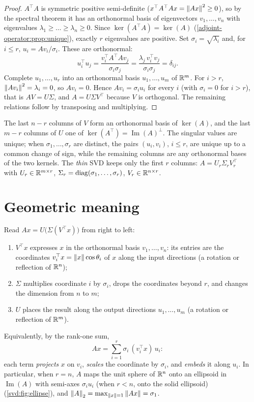 \begin{notechapter}
\begin{proof}
$A^\top A$ is symmetric positive semi-definite ($x^\top A^\top Ax = \left\|Ax\right\|^2\geq0$), so
by the spectral theorem it has an orthonormal basis of eigenvectors $v_1,\dots,v_n$ with
eigenvalues $\lambda_1\geq\dots\geq\lambda_n\geq0$. Since $\ker(A^\top A) = \ker(A)$
(\cref{adjoint-operator:prop:unique}), exactly $r$ eigenvalues are positive. Set
$\sigma_i = \sqrt{\lambda_i}$ and, for $i\leq r$, $u_i = Av_i/\sigma_i$. These are
orthonormal:
\[
  u_i^\top u_j = \frac{v_i^\top A^\top Av_j}{\sigma_i\sigma_j} = \frac{\lambda_j\,v_i^\top v_j}{\sigma_i\sigma_j} = \delta_{ij}.
\]
Complete $u_1,\dots,u_r$ into an orthonormal basis $u_1,\dots,u_m$ of $\mathbb{R}^m$. For $i>r$,
$\left\|Av_i\right\|^2 = \lambda_i = 0$, so $Av_i = 0$. Hence $Av_i = \sigma_iu_i$ for every $i$
(with $\sigma_i = 0$ for $i>r$), that is $AV = U\Sigma$, and $A = U\Sigma V^\top$ because $V$
is orthogonal. The remaining relations follow by transposing and multiplying.
\end{proof}

The last $n-r$ columns of $V$ form an orthonormal basis of $\ker(A)$, and the last
$m-r$ columns of $U$ one of $\ker(A^\top) = \operatorname{Im}(A)^\perp$. The singular
values are unique; when $\sigma_1, \ldots, \sigma_r$ are distinct, the pairs $(u_i, v_i)$,
$i\leq r$, are unique up to a common change of sign, while the remaining columns are any
orthonormal bases of the two kernels. The \emph{thin} SVD keeps only the first $r$ columns: $A = U_r\Sigma_rV_r^\top$
with $U_r\in\mathbb{R}^{m\times r}$, $\Sigma_r = \operatorname{diag}(\sigma_1,\dots,\sigma_r)$, $V_r\in\mathbb{R}^{n\times r}$.

\section{Geometric meaning}\label{svd:sec:geometry}

Read $Ax = U\bigl(\Sigma(V^\top x)\bigr)$ from right to left:
\begin{enumerate}
  \item $V^\top x$ expresses $x$ in the orthonormal basis $v_1,\dots,v_n$: its entries are
        the coordinates $v_i^\top x = \left\|x\right\|\cos\theta_i$ of $x$ along the input directions
        (a rotation or reflection of $\mathbb{R}^n$);
  \item $\Sigma$ multiplies coordinate $i$ by $\sigma_i$, drops the coordinates beyond $r$,
        and changes the dimension from $n$ to $m$;
  \item $U$ places the result along the output directions $u_1,\dots,u_m$ (a rotation or
        reflection of $\mathbb{R}^m$).
\end{enumerate}
Equivalently, by the rank-one sum,
\[
  Ax = \sum_{i=1}^r\sigma_i\,(v_i^\top x)\,u_i :
\]
each term \emph{projects} $x$ on $v_i$, \emph{scales} the coordinate by $\sigma_i$, and
\emph{embeds} it along $u_i$. In particular, when $r = n$, $A$ maps the unit sphere of $\mathbb{R}^n$ onto an
ellipsoid in $\operatorname{Im}(A)$ with semi-axes $\sigma_iu_i$ (when $r < n$, onto the solid ellipsoid)
(\cref{svd:fig:ellipse}), and $\left\|A\right\|_2 = \max_{\left\|x\right\|=1}\left\|Ax\right\| = \sigma_1$.


\end{notechapter}
